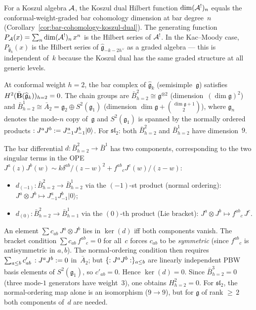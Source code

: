 \begin{remark}\label{rem:bar-hilbert-koszul-dual}
For a Koszul algebra $\mathcal{A}$, the Koszul dual Hilbert function $\dim (\mathcal{A}^!)_n$ equals the conformal-weight-graded bar cohomology dimension at bar degree~$n$ (Corollary~\ref{cor:bar-cohomology-koszul-dual}).  The generating function $P_{\mathcal{A}}(x) = \sum_n \dim (\mathcal{A}^!)_n\, x^n$ is the Hilbert series of $\mathcal{A}^!$.  In the Kac--Moody case, $P_{\widehat{\mathfrak{g}}_k}(x)$ is the Hilbert series of $\widehat{\mathfrak{g}}_{-k-2h^\vee}$ as a graded algebra --- this is independent of~$k$ because the Koszul dual has the same graded structure at all generic levels.
\end{remark}

\begin{lemma}\label{lem:bar-deg2-symmetric-square}
At conformal weight $h = 2$, the bar complex of
$\widehat{\mathfrak{g}}_k$ (semisimple~$\mathfrak{g}$) satisfies
$H^2(\bar{\mathbf{B}}(\widehat{\mathfrak{g}}_k))_{h=2} = 0$.
The chain groups are $\bar{B}^2_{h=2} \cong \mathfrak{g}^{\otimes 2}$
(dimension~$(\dim\mathfrak{g})^2$) and
$\bar{B}^1_{h=2} \cong \bar{A}_2 = \mathfrak{g}_2 \oplus S^2(\mathfrak{g}_1)$
(dimension $\dim\mathfrak{g} + \binom{\dim\mathfrak{g}+1}{2}$),
where $\mathfrak{g}_n$ denotes the mode-$n$ copy of~$\mathfrak{g}$
and $S^2(\mathfrak{g}_1)$ is spanned by the normally ordered products
$:{J^a J^b}: = J^a_{-1}J^b_{-1}|0\rangle$.  For
$\mathfrak{sl}_2$: both $\bar{B}^2_{h=2}$ and $\bar{B}^1_{h=2}$
have dimension~$9$.

The bar differential $d \colon \bar{B}^2_{h=2} \to \bar{B}^1$
has two components, corresponding to the two singular terms in the
OPE $J^a(z)J^b(w) \sim k\delta^{ab}/(z-w)^2 + f^{ab}{}_c
J^c(w)/(z-w)$:
\begin{itemize}
\item $d_{(-1)} \colon \bar{B}^2_{h=2} \to \bar{B}^1_{h=2}$
  via the $(-1)$-st product (normal ordering):
  $J^a \otimes J^b \mapsto J^a_{-1}J^b_{-1}|0\rangle$;

\item $d_{(0)} \colon \bar{B}^2_{h=2} \to \bar{B}^1_{h=1}$
  via the $(0)$-th product (Lie bracket):
  $J^a \otimes J^b \mapsto f^{ab}{}_c\, J^c$.
\end{itemize}

An element $\sum c_{ab}\, J^a \otimes J^b$ lies in $\ker(d)$ iff
both components vanish.  The bracket condition
$\sum c_{ab}\, f^{ab}{}_c = 0$ for all~$c$ forces $c_{ab}$
to be \emph{symmetric} (since $f^{ab}{}_c$ is antisymmetric in
$a,b$).  The normal-ordering condition then requires
$\sum_{a \leq b} c'_{ab}\, :{J^a J^b}: = 0$
in~$\bar{A}_2$; but $\{:{J^a J^b}:\}_{a \leq b}$ are
linearly independent PBW basis elements of
$S^2(\mathfrak{g}_1)$, so $c'_{ab} = 0$.
Hence $\ker(d) = 0$.  Since $\bar{B}^3_{h=2} = 0$ (three
mode-$1$ generators have weight~$3$), one obtains $H^2_{h=2} = 0$.
For $\mathfrak{sl}_2$, the normal-ordering map alone is an
isomorphism ($9 \to 9$), but for $\mathfrak{g}$ of rank
${\geq}\, 2$ both components of~$d$ are needed.


\end{lemma}
